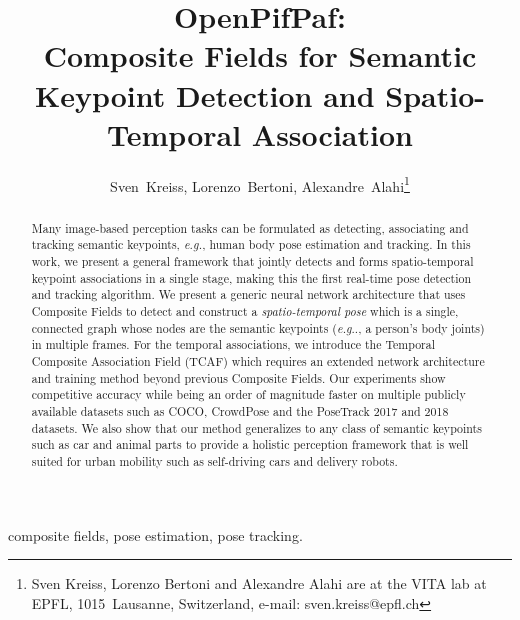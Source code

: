 \documentclass[journal]{IEEEtran}
\makeatletter
\DeclareRobustCommand\onedot{\futurelet\@let@token\@onedot}
\def\@onedot{\ifx\@let@token.\else.\null\fi\xspace}
\def\eg{\emph{e.g}\onedot} \def\Eg{\emph{E.g}\onedot}
\makeatother
\begin{document}
\title{OpenPifPaf:\\ Composite Fields for Semantic Keypoint Detection and Spatio-Temporal Association}



\author{Sven~Kreiss,
        Lorenzo~Bertoni,
        Alexandre~Alahi\thanks{Sven Kreiss, Lorenzo Bertoni and Alexandre Alahi are at the VITA lab at EPFL,
1015~Lausanne, Switzerland,
e-mail: sven.kreiss@epfl.ch}}



















\maketitle

\begin{abstract}
Many image-based perception tasks can be formulated as detecting, associating and tracking semantic keypoints, \textit{e.g.}, human body pose estimation and tracking. In this work, we present a general framework that jointly detects and forms spatio-temporal keypoint associations in a single stage, making this the first real-time pose detection and tracking algorithm.
We present a generic neural network architecture that uses Composite Fields to detect and construct a \emph{spatio-temporal pose} which is a single, connected
graph whose nodes are the semantic keypoints (\eg, a person's body joints)
in multiple frames.
For the temporal associations, we introduce the Temporal Composite Association Field (TCAF) which requires an extended network architecture and training method beyond previous Composite Fields.
Our experiments show competitive accuracy while being an order of magnitude faster on multiple publicly available datasets such as COCO, CrowdPose and
the PoseTrack 2017 and 2018 datasets.
We also show that our method generalizes to any class of semantic keypoints such as car and animal parts to provide
a holistic perception framework that is well suited for urban mobility such as self-driving cars and delivery robots.
\end{abstract}

\begin{IEEEkeywords}
composite fields, pose estimation, pose tracking.
\end{IEEEkeywords}
\end{document}
